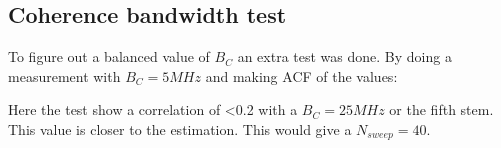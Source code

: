 \subsection{Coherence bandwidth test}
To figure out a balanced value of $B_C$ an extra test was done. By doing a measurement with $B_C = 5MHz$ and making \gls{ACF} of the values:


Here the test show a correlation of <0.2 with a $B_C = 25MHz$ or the fifth stem. This value is closer to the estimation. This would give a  $N_{sweep} = 40$.

